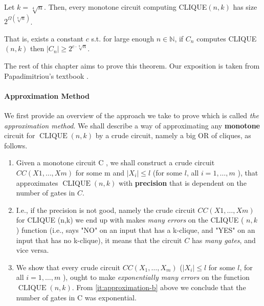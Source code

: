 \begin{svgraybox}
\begin{theorem}\label{thm:razborov} 
Let $k=\sqrt[4]{n}$. Then, every monotone circuit computing CLIQUE$(n, k)$ has size $2^{\Omega(\sqrt[8]{n})}$.
\end{theorem}
\end{svgraybox}
That is, exists a constant $c$ s.t. for large enough $n \in \mathbb{N}$, if $C_n$ computes CLIQUE$(n,k)$ then $\left|C_n\right| \geqslant 2^{c \cdot \sqrt[8]{n}}$.


The rest of this chapter aims to prove this theorem. Our exposition is taken from Papadimitriou's textbook \cite{Pap94}.





\paragraph{Approximation Method}

We first provide an overview of the approach we take to prove  which is called \emph{the approximation method}. 
We shall describe a way of approximating any \textbf{monotone} circuit for $\operatorname{CLIQUE}({n}, {k})$ by a crude circuit, namely a big OR of cliques, as follows.

\begin{enumerate}
    
\item  Given a monotone circuit C , we shall construct a crude circuit ${CC}({X} 1, \ldots, {Xm})$ for some m and $\left|{X}_{{i}}\right| \leq l$ (for some $l$, all ${i}=1, \ldots, {m}$ ), that approximates $\operatorname{CLIQUE}({n}, {k})$ with \textbf{precision} that is dependent on the number of gates in $C$.

\item I.e., if the precision is not good, namely the crude circuit ${CC}({X} 1, \ldots, {Xm})$ for CLIQUE (n,k) we end up with makes \textit{many errors} on the CLIQUE ( $n, k$ ) function (i.e., says "NO" on an input that has a k-clique, and "YES" on an input that has no k-clique), it means that the circuit $C$ has \textit{many gates}, and vice versa.\label{it:approximation-b}

\item We show that every crude circuit ${CC}({X}_1, \ldots, {X_m})$ ($|{X}_i| \leq l$ for some $l$, for all $i=1, \ldots, m$ ), ought to make \textit{exponentially many errors} on the function $\operatorname{CLIQUE}(n, k)$. From \ref{it:approximation-b} above we conclude that the number of gates in C was exponential.

\end{enumerate}


